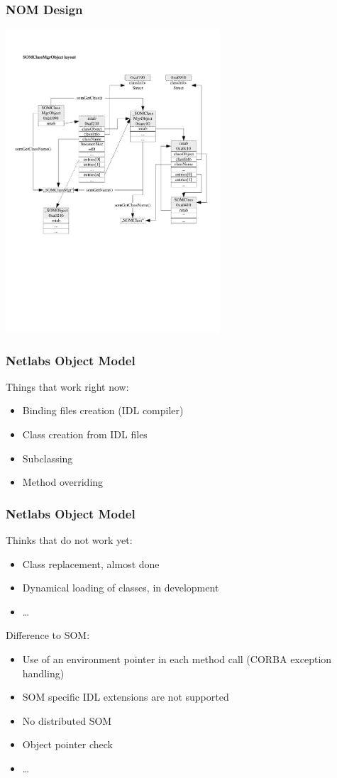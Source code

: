 \documentclass{beamer}
\begin{document}
\begin{frame}
\frametitle{NOM Design}
\includegraphics[width=8cm]{images/SOMClassMgrObject-layout.pdf}

\end{frame}

\begin{frame}
\frametitle{Netlabs Object Model}
Things that work right now:
\begin{itemize}[<+->]
  \item Binding files creation (IDL compiler)
  \item Class creation from IDL files
  \item Subclassing
  \item Method overriding
\end{itemize}
\end{frame}

\begin{frame}
\frametitle{Netlabs Object Model}
Thinks that do not work yet:
\begin{itemize}[<+->]
  \item Class replacement, almost done
  \item Dynamical loading of classes, in development
  \item \ldots
\end{itemize}
Difference to SOM:
\begin{itemize}[<+->]
  \item Use of an environment pointer in each method call (CORBA exception
  handling)
  \item SOM specific IDL extensions are not supported
  \item No distributed SOM
  \item Object pointer check
  \item \ldots
\end{itemize}
\end{frame}
\end{document}
